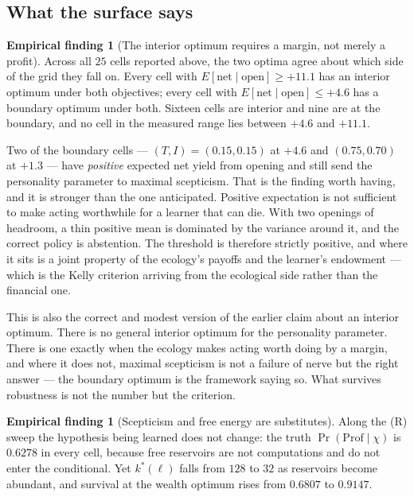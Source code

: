 \documentclass[11pt,a4paper]{article}
\theoremstyle{plain}
\theoremstyle{definition}
\newtheorem{finding}[theorem]{Empirical finding}
\theoremstyle{remark}
\begin{document}
\subsection{What the surface says}

\begin{finding}[The interior optimum requires a margin, not merely a profit]
\label{find:interior}
Across all $25$ cells reported above, the two optima agree about which side of the
grid they fall on. Every cell with $E[\text{net}\mid\text{open}] \ge +11.1$ has an
interior optimum under both objectives; every cell with
$E[\text{net}\mid\text{open}] \le +4.6$ has a boundary optimum under both. Sixteen
cells are interior and nine are at the boundary, and no cell in the measured
range lies between $+4.6$ and $+11.1$.
\end{finding}

Two of the boundary cells --- $(T,I) = (0.15,0.15)$ at $+4.6$ and
$(0.75,0.70)$ at $+1.3$ --- have \emph{positive} expected net yield from opening
and still send the personality parameter to maximal scepticism. That is the
finding worth having, and it is stronger than the one anticipated. Positive
expectation is not sufficient to make acting worthwhile for a learner that can
die. With two openings of headroom, a thin positive mean is dominated by the
variance around it, and the correct policy is abstention. The threshold is
therefore strictly positive, and where it sits is a joint property of the
ecology's payoffs and the learner's endowment --- which is the Kelly criterion
arriving from the ecological side rather than the financial one.

This is also the correct and modest version of the earlier claim about an
interior optimum. There is no general interior optimum for the personality
parameter. There is one exactly when the ecology makes acting worth doing by a
margin, and where it does not, maximal scepticism is not a failure of nerve but
the right answer --- the boundary optimum is the framework saying so. What
survives robustness is not the number but the criterion.

\begin{finding}[Scepticism and free energy are substitutes]\label{find:substitute}
Along the (R) sweep the hypothesis being learned does not change: the truth
$\Pr(\mathrm{Prof}\mid\chi)$ is $0.6278$ in every cell, because free reservoirs
are not computations and do not enter the conditional. Yet $k^*(\ell)$ falls from
$128$ to $32$ as reservoirs become abundant, and survival at the wealth optimum
rises from $0.6807$ to $0.9147$.
\end{finding}
\end{document}

